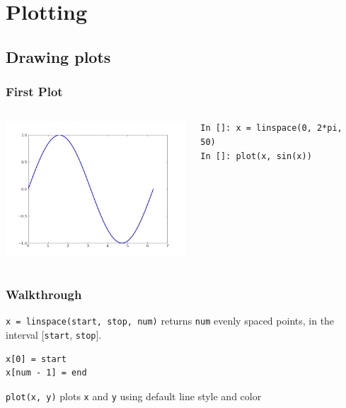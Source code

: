 \documentclass[14pt,compress]{beamer}
\newcounter{time}
\newcommand{\inctime}[1]{\addtocounter{time}{#1}{\tiny \thetime\ m}}
\newcommand{\typ}[1]{\lstinline{#1}}
\begin{document}
\section{Plotting}
\subsection{Drawing plots}
\begin{frame}[fragile]
\frametitle{First Plot}
\begin{columns}
    \hspace*{-0.5in}
  \includegraphics[height=2in, interpolate=true]{data/firstplot}
    \begin{block}{}
    \begin{small}
\begin{lstlisting}
In []: x = linspace(0, 2*pi, 50)
In []: plot(x, sin(x))
\end{lstlisting}
    \end{small}
    \end{block}
\end{columns}
\end{frame}

\begin{frame}[fragile]
\frametitle{Walkthrough}
\begin{block}{\typ{x = linspace(start, stop, num)} }
returns \typ{num} evenly spaced points, in the interval [\typ{start}, \typ{stop}].
\end{block}
\begin{lstlisting}
x[0] = start
x[num - 1] = end
\end{lstlisting}
\vspace*{.35in}
\begin{block}{\typ{plot(x, y)}}
plots \typ{x} and \typ{y} using default line style and color
\end{block}
\end{frame}
\end{document}

